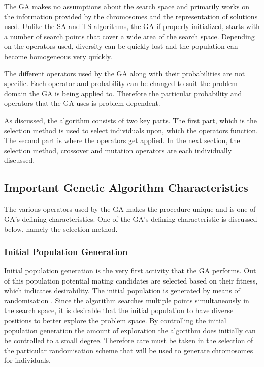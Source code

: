 The \gls{GA} makes no assumptions about the search space and primarily works on the information provided by the chromosomes and the representation of solutions used\cite{CompuIntelligenceIntro,ConstrainedGA,HybridIntelliGA}. Unlike the \gls{SA} and \gls{TS} algorithms, the \gls{GA} if properly initialized, starts with a number of search points that cover a wide area of the search space. Depending on the operators used, diversity can be quickly lost and the population can become homogeneous very quickly\cite{DistributedHierarchicalGA,FamilyGA,HybridIntelliGA}\label{GASearchPoints}.
 
The different operators used by the GA along with their probabilities are not specific. Each operator and probability can be changed to suit the problem domain the GA is being applied to. Therefore the particular probability and operators that the GA uses is problem dependent.

As discussed, the algorithm consists of two key parts. The first part, which is the selection method is used to select individuals upon, which the operators function. The second part is where the operators get applied. In the next section, the selection method, crossover and mutation operators are each individually discussed.

\subsection{Important Genetic Algorithm Characteristics}
The various operators used by the \gls{GA} makes the procedure unique and is one of \gls{GA}'s defining characteristics. One of the \gls{GA}'s defining characteristic is discussed below, namely the selection method.

\subsubsection{Initial Population Generation}
Initial population generation is the very first activity that the \gls{GA} performs. Out of this population potential mating candidates are selected based on their fitness, which indicates desirability. The initial population is generated by means of randomisation \cite{SelfAdaptiveGA}. Since the algorithm searches multiple points simultaneously in the search space, it is desirable that the initial population to have diverse positions to better explore the problem space\cite{CombinedBranchBoundGA,DistributedHierarchicalGA}. By controlling the initial population generation the amount of exploration the algorithm does initially can be controlled to a small degree\cite{CombinedBranchBoundGA}. Therefore care must be taken in the selection of the particular randomisation scheme that will be used to generate chromosomes for individuals.

